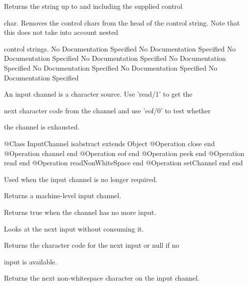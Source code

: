         Returns the string up to and including the supplied control

        char. Removes the control chars from the head of the control 
        string. Note that this does not take into account nested

        control strings.
No Documentation Specified
No Documentation Specified
No Documentation Specified
No Documentation Specified
No Documentation Specified
No Documentation Specified
No Documentation Specified
No Documentation Specified

       An input channel is a character source. Use 'read/1' to get the

       next character code from the channel and use 'eof/0' to test whether

       the channel is exhausted.
\begin{Interface}
@Class InputChannel isabstract extends Object
  @Operation close end
  @Operation channel end
  @Operation eof end
  @Operation peek end
  @Operation read end
  @Operation readNonWhiteSpace end
  @Operation setChannel end
end
\end{Interface}

          Used when the input channel is no longer required.

           Returns a machine-level input channel.

          Returns true when the channel has no more input.

          Looks at the next input without consuming it.

          Returns the character code for the next input or null if no

          input is available.

          Returns the next non-whitespace character on the input channel.

